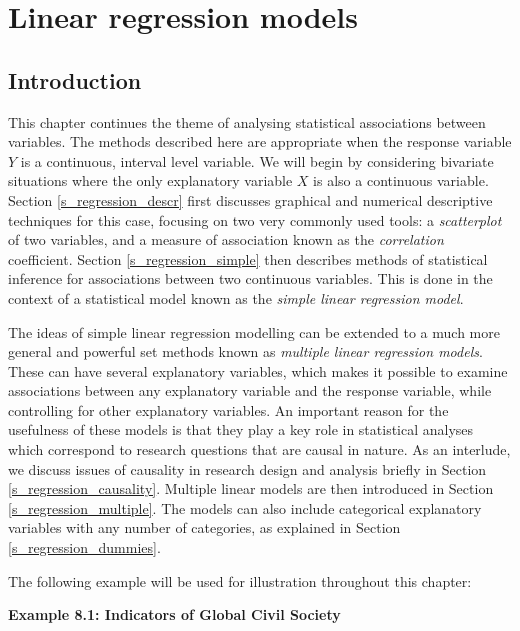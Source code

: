 \chapter{Linear regression models}
\label{c_regression}

\section{Introduction}
\label{s_regression_intro}

This chapter continues the theme of analysing statistical associations
between variables. The methods described here are appropriate when the
response variable $Y$ is a continuous, interval level variable. We
will begin by considering bivariate situations where the only explanatory variable
$X$ is also a continuous variable. Section \ref{s_regression_descr}
first discusses graphical and numerical descriptive techniques for this
case, focusing on two very commonly used tools: a \emph{scatterplot} of
two variables, and a measure of association known as the
\emph{correlation} coefficient. Section \ref{s_regression_simple} then
describes methods of statistical inference for associations between two
continuous variables. This is done in the context of a statistical model
known as the \emph{simple linear regression model}.

The ideas of simple linear regression modelling can be extended to a
much more general and powerful set methods known as \emph{multiple
linear regression models}.
These can have several explanatory
variables, which makes it possible to examine associations between any
explanatory variable and the response variable, while controlling for
other explanatory variables.
An important reason for the usefulness of
these models is that they play a key role in statistical analyses
which correspond to research questions that are causal in nature.
As an interlude, we discuss issues of causality in research design and
analysis briefly in Section \ref{s_regression_causality}.
Multiple linear models are then
introduced in Section
\ref{s_regression_multiple}.
The models can also include categorical
explanatory variables with any number of categories, as explained in
Section \ref{s_regression_dummies}.

The following example will be used for illustration throughout this
chapter:

\textbf{Example 8.1: Indicators of Global Civil Society}
\label{p_civilsoc}

